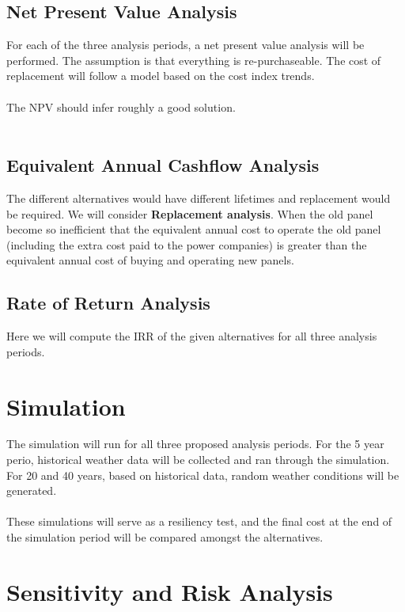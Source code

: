 \documentclass[10pt,letterpaper]{article}
\begin{document}
\subsection{Net Present Value Analysis}

For each of the three analysis periods, a net present value analysis will be performed. The assumption is that everything is re-purchaseable. The cost of replacement will follow a model based on the cost index trends.\\
\\
The NPV should infer roughly a good solution.\\
\\

\subsection{Equivalent Annual Cashflow Analysis}
The different alternatives would have different lifetimes and replacement would be required. We will consider \textbf{Replacement analysis}. When the old panel become so inefficient that the equivalent annual cost to operate the old panel (including the extra cost paid to the power companies) is greater than the equivalent annual cost of buying and operating new panels.\\

\subsection{Rate of Return Analysis}\label{subsection:rate-of-return}
Here we will compute the IRR of the given alternatives for all three analysis periods.\\

\section{Simulation}

The simulation will run for all three proposed analysis periods. For the 5 year perio, historical weather data will be collected and ran through the simulation. For 20 and 40 years, based on historical data, random weather conditions will be generated.\\
\\
These simulations will serve as a resiliency test, and the final cost at the end of the simulation period will be compared amongst the alternatives.\\

\section{Sensitivity and Risk Analysis}
\end{document}
